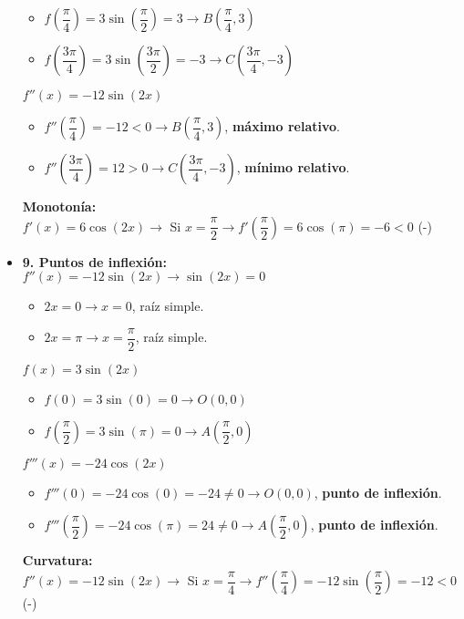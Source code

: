 \begin{itemize}
\begin{itemize}
		\item $f(\dfrac{\pi}{4})=3 \sin(\dfrac{\pi}{2}) = 3 \rightarrow B(\dfrac{\pi}{4}, 3)$
		\item $f(\dfrac{3\pi}{4})=3 \sin(\dfrac{3\pi}{2}) = -3 \rightarrow C(\dfrac{3\pi}{4}, -3)$
	\end{itemize}
	$f''(x)=-12 \sin(2x)$
	\begin{itemize}
		\item $f''(\dfrac{\pi}{4})=-12 <0 \rightarrow B(\dfrac{\pi}{4}, 3)$, \textbf{máximo relativo}.
		\item $f''(\dfrac{3\pi}{4})=12 >0 \rightarrow C(\dfrac{3\pi}{4}, -3)$, \textbf{mínimo relativo}.
	\end{itemize}
	\textbf{Monotonía: }\\
	$f'(x) = 6 \cos(2x) \rightarrow$ Si $x=\dfrac{\pi}{2} \rightarrow f'(\dfrac{\pi}{2}) = 6 \cos(\pi) = -6 < 0$ (-)
	\item \textbf{9. Puntos de inflexión:}\\
	$f''(x)=-12\sin(2x) \rightarrow \sin(2x) = 0$
	\begin{itemize}
		\item $2x=0 \rightarrow x=0$, raíz simple. 
		\item $2x=\pi \rightarrow x=\dfrac{\pi}{2}$, raíz simple. 
	\end{itemize}
	$f(x)=3\sin(2x)$
	\begin{itemize}
		\item $f(0)=3\sin(0)=0 \rightarrow O(0,0)$ 
		\item $f(\dfrac{\pi}{2})=3\sin(\pi)=0 \rightarrow A(\dfrac{\pi}{2},0)$  
	\end{itemize}
	$f'''(x)=-24\cos(2x)$
	\begin{itemize}
		\item $f'''(0)=-24\cos(0)=-24 \neq 0 \rightarrow O(0,0)$, \textbf{punto de inflexión}. 
		\item $f'''(\dfrac{\pi}{2})=-24\cos(\pi)=24 \neq 0 \rightarrow A(\dfrac{\pi}{2},0)$, \textbf{punto de inflexión}.
	\end{itemize}	
	\textbf{Curvatura: }\\
	$f''(x)=-12 \sin(2x) \rightarrow$ Si $x=\dfrac{\pi}{4} \rightarrow f''(\dfrac{\pi}{4})=-12 \sin (\dfrac{\pi}{2}) = -12 <0$ (-)
\end{itemize}
